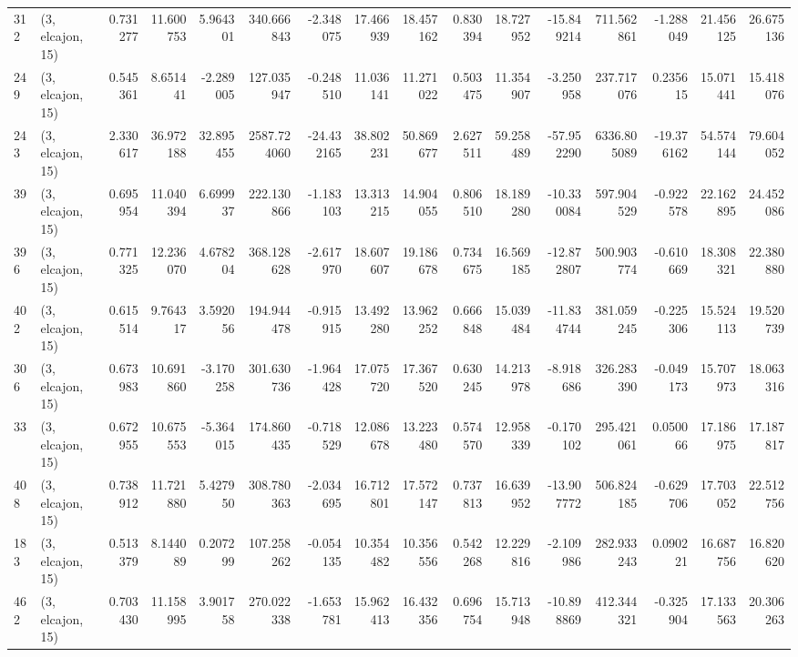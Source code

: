 \begin{tabular}{llrrrrrrrrrrrrrr}
312 &  (3, elcajon, 15) &   0.731277 &  11.600753 &   5.964301 &   340.666843 &  -2.348075 &  17.466939 &  18.457162 &  0.830394 &  18.727952 & -15.849214 &    711.562861 &   -1.288049 &   21.456125 &   26.675136 \\
249 &  (3, elcajon, 15) &   0.545361 &   8.651441 &  -2.289005 &   127.035947 &  -0.248510 &  11.036141 &  11.271022 &  0.503475 &  11.354907 &  -3.250958 &    237.717076 &    0.235615 &   15.071441 &   15.418076 \\
243 &  (3, elcajon, 15) &   2.330617 &  36.972188 &  32.895455 &  2587.724060 & -24.432165 &  38.802231 &  50.869677 &  2.627511 &  59.258489 & -57.952290 &   6336.805089 &  -19.376162 &   54.574144 &   79.604052 \\
39  &  (3, elcajon, 15) &   0.695954 &  11.040394 &   6.699937 &   222.130866 &  -1.183103 &  13.313215 &  14.904055 &  0.806510 &  18.189280 & -10.330084 &    597.904529 &   -0.922578 &   22.162895 &   24.452086 \\
396 &  (3, elcajon, 15) &   0.771325 &  12.236070 &   4.678204 &   368.128628 &  -2.617970 &  18.607607 &  19.186678 &  0.734675 &  16.569185 & -12.872807 &    500.903774 &   -0.610669 &   18.308321 &   22.380880 \\
402 &  (3, elcajon, 15) &   0.615514 &   9.764317 &   3.592056 &   194.944478 &  -0.915915 &  13.492280 &  13.962252 &  0.666848 &  15.039484 & -11.834744 &    381.059245 &   -0.225306 &   15.524113 &   19.520739 \\
306 &  (3, elcajon, 15) &   0.673983 &  10.691860 &  -3.170258 &   301.630736 &  -1.964428 &  17.075720 &  17.367520 &  0.630245 &  14.213978 &  -8.918686 &    326.283390 &   -0.049173 &   15.707973 &   18.063316 \\
33  &  (3, elcajon, 15) &   0.672955 &  10.675553 &  -5.364015 &   174.860435 &  -0.718529 &  12.086678 &  13.223480 &  0.574570 &  12.958339 &  -0.170102 &    295.421061 &    0.050066 &   17.186975 &   17.187817 \\
408 &  (3, elcajon, 15) &   0.738912 &  11.721880 &   5.427950 &   308.780363 &  -2.034695 &  16.712801 &  17.572147 &  0.737813 &  16.639952 & -13.907772 &    506.824185 &   -0.629706 &   17.703052 &   22.512756 \\
183 &  (3, elcajon, 15) &   0.513379 &   8.144089 &   0.207299 &   107.258262 &  -0.054135 &  10.354482 &  10.356556 &  0.542268 &  12.229816 &  -2.109986 &    282.933243 &    0.090221 &   16.687756 &   16.820620 \\
462 &  (3, elcajon, 15) &   0.703430 &  11.158995 &   3.901758 &   270.022338 &  -1.653781 &  15.962413 &  16.432356 &  0.696754 &  15.713948 & -10.898869 &    412.344321 &   -0.325904 &   17.133563 &   20.306263 \\

\end{tabular}
